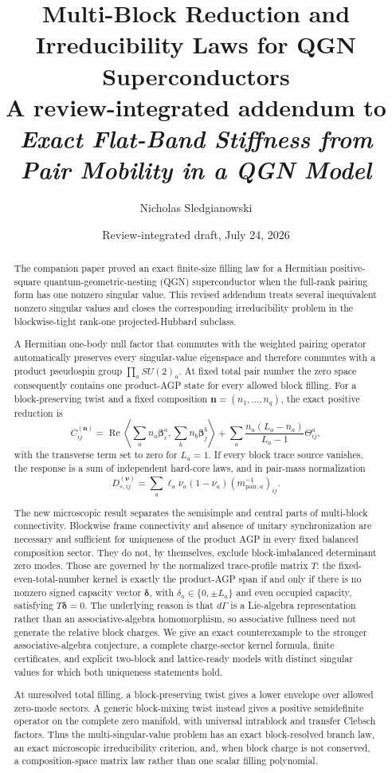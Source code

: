 \documentclass[11pt]{article}
\title{\textbf{Multi-Block Reduction and Irreducibility Laws for QGN Superconductors}\\[0.45em]
\large A review-integrated addendum to \emph{Exact Flat-Band Stiffness from Pair Mobility in a QGN Model}}
\author{Nicholas Sledgianowski}
\date{Review-integrated draft, July 24, 2026}
\numberwithin{equation}{section}
\newcommand{\bn}{\mathbf n}
\newcommand{\bbeta}{\boldsymbol\beta}
\newcommand{\Ree}{\operatorname{Re}}
\begin{document}
\maketitle

\begin{abstract}
The companion paper proved an exact finite-size filling law for a Hermitian positive-square quantum-geometric-nesting (QGN) superconductor when the full-rank pairing form has one nonzero singular value.  This revised addendum treats several inequivalent nonzero singular values and closes the corresponding irreducibility problem in the blockwise-tight rank-one projected-Hubbard subclass.

A Hermitian one-body null factor that commutes with the weighted pairing operator automatically preserves every singular-value eigenspace and therefore commutes with a product pseudospin group $\prod_a SU(2)_a$.  At fixed total pair number the zero space consequently contains one product-AGP state for every allowed block filling.  For a block-preserving twist and a fixed composition $\bn=(n_1,\ldots,n_q)$, the exact positive reduction is
\[
 C_{ij}^{(\bn)}
 =
 \Ree\left\langle\sum_a n_a\bbeta_i^a,\sum_b n_b\bbeta_j^b\right\rangle
 +
 \sum_a\frac{n_a(L_a-n_a)}{L_a-1}\Theta_{ij}^a,
\]
with the transverse term set to zero for $L_a=1$.  If every block trace source vanishes, the response is a sum of independent hard-core laws, and in pair-mass normalization
\[
 D_{s,ij}^{(\boldsymbol\nu)}
 =
 \sum_a\ell_a\nu_a(1-\nu_a)
 (m_{\mathrm{pair},a}^{-1})_{ij}.
\]

The new microscopic result separates the semisimple and central parts of multi-block connectivity.  Blockwise frame connectivity and absence of unitary synchronization are necessary and sufficient for uniqueness of the product AGP in every fixed balanced composition sector.  They do not, by themselves, exclude block-imbalanced determinant zero modes.  Those are governed by the normalized trace-profile matrix $T$: the fixed-even-total-number kernel is exactly the product-AGP span if and only if there is no nonzero signed capacity vector $\boldsymbol\delta$, with $\delta_a\in\{0,\pm L_a\}$ and even occupied capacity, satisfying $T\boldsymbol\delta=0$.  The underlying reason is that $d\Gamma$ is a Lie-algebra representation rather than an associative-algebra homomorphism, so associative fullness need not generate the relative block charges.  We give an exact counterexample to the stronger associative-algebra conjecture, a complete charge-sector kernel formula, finite certificates, and explicit two-block and lattice-ready models with distinct singular values for which both uniqueness statements hold.

At unresolved total filling, a block-preserving twist gives a lower envelope over allowed zero-mode sectors.  A generic block-mixing twist instead gives a positive semidefinite operator on the complete zero manifold, with universal intrablock and transfer Clebsch factors.  Thus the multi-singular-value problem has an exact block-resolved branch law, an exact microscopic irreducibility criterion, and, when block charge is not conserved, a composition-space matrix law rather than one scalar filling polynomial.
\end{abstract}
\end{document}
